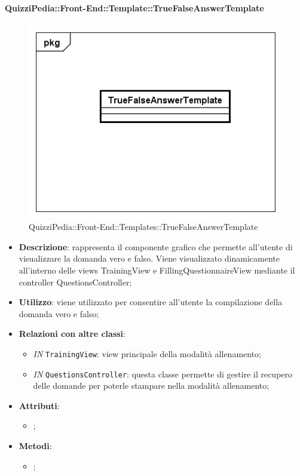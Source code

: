 		\paragraph{QuizziPedia::Front-End::Template::TrueFalseAnswerTemplate}
		
		\label{QuizziPedia::Front-End::Templates::TrueFalseAnswerTemplate}
		
		\begin{figure}[ht]
			\centering
			\includegraphics[scale=0.5,keepaspectratio]{UML/Classi/Front-End/QuizziPedia_Front-end_Templates_TrueFalseAnswerTemplate.png}
			\caption{QuizziPedia::Front-End::Templates::TrueFalseAnswerTemplate}
		\end{figure} \FloatBarrier
		
		\begin{itemize}
			\item \textbf{Descrizione}: rappresenta il componente grafico che permette all'utente di visualizzare la domanda vero e falso. Viene visualizzato dinamicamente all'interno delle views TrainingView e FillingQuestionnaireView mediante il controller QuestionsController;
			\item \textbf{Utilizzo}: viene utilizzato per consentire all'utente la compilazione della domanda vero e falso;
			\item \textbf{Relazioni con altre classi}: 
			\begin{itemize}
				\item \textit{IN} \texttt{TrainingView}: view principale della modalità allenamento; 
				\item \textit{IN} \texttt{QuestionsController}: questa classe permette di gestire il recupero delle domande per poterle stampare nella modalità allenamento;
			\end{itemize}
			\item \textbf{Attributi}: 
			\begin{itemize}
				\item ;
			\end{itemize}
			\item \textbf{Metodi}: 
			\begin{itemize}
				\item ;
			\end{itemize}
		\end{itemize}																	